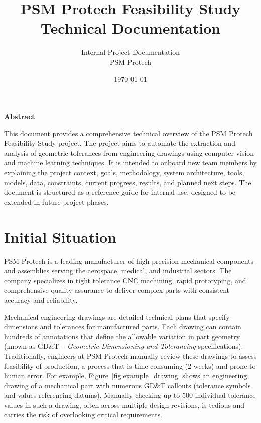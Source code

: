 \documentclass[11pt,a4paper]{article}
\title{\textbf{PSM Protech Feasibility Study}\\Technical Documentation}
\author{Internal Project Documentation \\ PSM Protech}
\date{\today}
\begin{document}
\maketitle
\thispagestyle{empty}
\begin{center}
\newpage
\textbf{Abstract}
\end{center}
\noindent
This document provides a comprehensive technical overview of the PSM Protech Feasibility Study project. The project aims to automate the extraction and analysis of geometric tolerances from engineering drawings using computer vision and machine learning techniques. It is intended to onboard new team members by explaining the project context, goals, methodology, system architecture, tools, models, data, constraints, current progress, results, and planned next steps. The document is structured as a reference guide for internal use, designed to be extended in future project phases.

\vfill
\newpage
\tableofcontents
\newpage

\section{Initial Situation}
PSM Protech is a leading manufacturer of high-precision mechanical components and assemblies serving the aerospace, medical, and industrial sectors. The company specializes in tight tolerance CNC machining, rapid prototyping, and comprehensive quality assurance to deliver complex parts with consistent accuracy and reliability.

Mechanical engineering drawings are detailed technical plans that specify dimensions and tolerances for manufactured parts. Each drawing can contain hundreds of annotations that define the allowable variation in part geometry (known as GD\&T -- \emph{Geometric Dimensioning and Tolerancing} specifications). Traditionally, engineers at PSM Protech manually review these drawings to assess feasibility of production, a process that is time-consuming (2 weeks) and prone to human error. For example, Figure~\ref{fig:example_drawing} shows an engineering drawing of a mechanical part with numerous GD\&T callouts (tolerance symbols and values referencing datums). Manually checking up to 500 individual tolerance values in such a drawing, often across multiple design revisions, is tedious and carries the risk of overlooking critical requirements.
\end{document}
